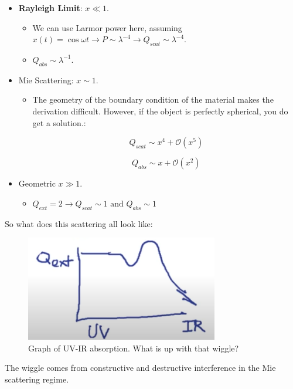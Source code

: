\documentclass{article}
\begin{document}
\begin{itemize}
    \item \textbf{Rayleigh Limit}: $x\ll1$. 
    \begin{itemize}
        \item We can use Larmor power here, assuming $x(t) = \cos\omega t \rightarrow P \sim \lambda^{-4} \rightarrow  Q_{scat} \sim \lambda^{-4}$.
        \item $Q_{abs} \sim \lambda^{-1}$.
    \end{itemize}
    \item Mie Scattering: $x \sim 1$.
    \begin{itemize}
        \item The geometry of the boundary condition of the material makes the derivation difficult. However, if the object is perfectly spherical, you do get a solution.:
        
        $$
        Q_{scat} \sim x^4 + \mathcal{O}\left(x^5\right)
        $$
        
        $$
        Q_{abs} \sim x + \mathcal{O}\left(x^2\right)
        $$
    \end{itemize}
    \item Geometric $x \gg 1$.
    \begin{itemize}
        \item $Q_{ext} = 2 \rightarrow Q_{scat} \sim 1 \text{ and } Q_{abs} \sim 1$
    \end{itemize}
\end{itemize}

So what does this scattering all look like: 

\begin{figure}
    \centering
    \includegraphics[width=0.75\textwidth]{figures/Screen Shot 2020-11-14 at 4.27.26 PM.png}
    \caption{Graph of UV-IR absorption. What is up with that wiggle?}
    \label{fig:my_label}
\end{figure}

The wiggle comes from constructive and destructive interference in the Mie scattering regime. 
\end{document}
